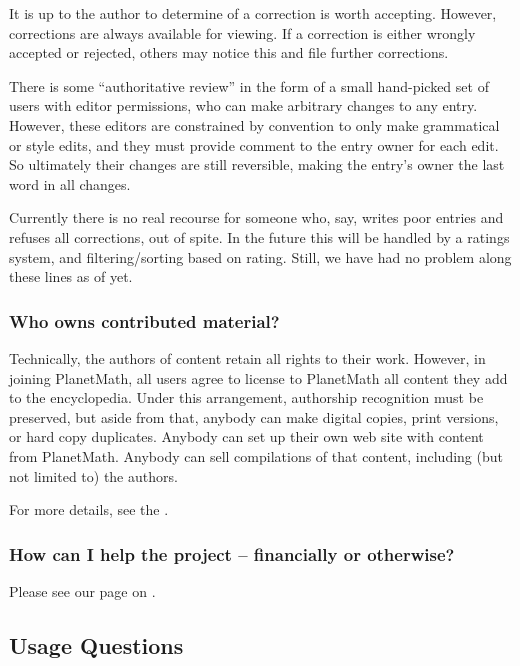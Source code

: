 It is up to the author to determine of a correction is worth accepting. However, corrections are always available for viewing. If a correction is either wrongly accepted or rejected, others may notice this and file further corrections.

There is some ``authoritative review'' in the form of a small hand-picked set of users with editor permissions, who can make arbitrary changes to any entry. However, these editors are constrained by convention to only make grammatical or style edits, and they must provide comment to the entry owner for each edit. So ultimately their changes are still reversible, making the entry's owner the last word in all changes.

Currently there is no real recourse for someone who, say, writes poor entries and refuses all corrections, out of spite. In the future this will be handled by a ratings system, and filtering/sorting based on rating. Still, we have had no problem along these lines as of yet.

\subsubsection*{Who owns contributed material?}
Technically, the authors of content retain all rights to their work. However, in joining PlanetMath, all users agree to license to PlanetMath all content they add to the encyclopedia. Under this arrangement, authorship recognition must be preserved, but aside from that, anybody can make digital copies, print versions, or hard copy duplicates. Anybody can set up their own web site with content from PlanetMath. Anybody can sell compilations of that content, including (but not limited to) the authors.

For more details, see the .

\subsubsection*{How can I help the project -- financially or otherwise?}
Please see our page on .


\subsection*{Usage Questions}
